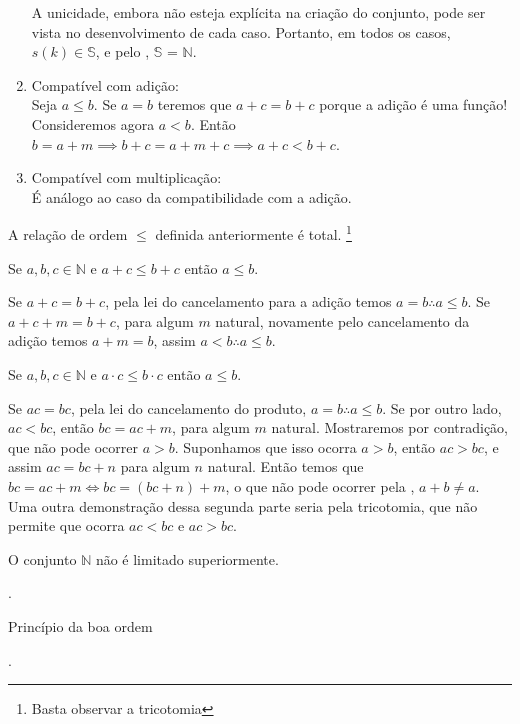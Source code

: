 \documentclass[../main.tex]{subfiles}
\begin{document}
\begin{dem}
\begin{enumerate}[label=(\roman*)]
        A unicidade, embora não esteja explícita na criação do conjunto, pode ser vista no desenvolvimento de cada caso.
        Portanto, em todos os casos, $s(k) \in \mathbb{S}$, e pelo , $\mathbb{S}$ = $\mathbb{N}$.
        
        \item Compatível com adição: \\
        Seja $a \leq b$. Se $a = b$ teremos que $a+c = b+c$ porque a adição é uma função! 
        Consideremos agora $a < b$. Então $b = a + m \implies b+c = a+m+c \implies a+c < b+c$.
        \item Compatível com multiplicação: \\
        É análogo ao caso da compatibilidade com a adição.
     \end{enumerate}
\end{dem}

\begin{corol}\label{nat-coro-tric}
    A relação de ordem $\leq$ definida anteriormente é total. \footnote{Basta observar a tricotomia}
\end{corol}

\begin{prop}
    Se $a,b,c \in \mathbb{N}$ e $a + c \leq b + c$ então $a \leq b$.
\end{prop}
\begin{dem}
    Se $a + c = b + c$, pela lei do cancelamento para a adição temos $a=b \therefore a \leq b$.
    Se $a + c + m = b + c$, para algum $m$ natural, novamente pelo cancelamento da adição temos $a+m = b$, assim $a < b \therefore a \leq b$.
\end{dem}
\begin{prop}
    Se $a,b,c \in \mathbb{N}$ e $a \cdot c \leq b \cdot c$ então $a \leq b$.
\end{prop}
\begin{dem}
    Se $ac = bc$, pela lei do cancelamento do produto, $a=b \therefore a \leq b$.
    Se por outro lado, $ac < bc$, então $bc = ac + m$, para algum $m$ natural. Mostraremos por contradição, que não pode ocorrer $a > b$.
    Suponhamos que isso ocorra $a > b$, então $ac > bc$, e assim $ac = bc + n$ para algum $n$ natural. Então temos que 
    $bc = ac + m \iff bc = (bc + n) + m$, o que não pode ocorrer pela , $a+b \neq a$. Uma outra demonstração dessa segunda parte seria pela tricotomia, que não permite que ocorra $ac < bc $ e $ac > bc$.
\end{dem}

\begin{teo}\label{nat-teo-ilimitadoSuperiormente}
    O conjunto $\mathbb{N}$ não é limitado superiormente.
\end{teo}
\begin{dem}
    .
\end{dem}
\begin{teo}\label{nat-teo-PBO}
    Princípio da boa ordem
\end{teo}
\begin{dem}
    .
\end{dem}
\end{document}
